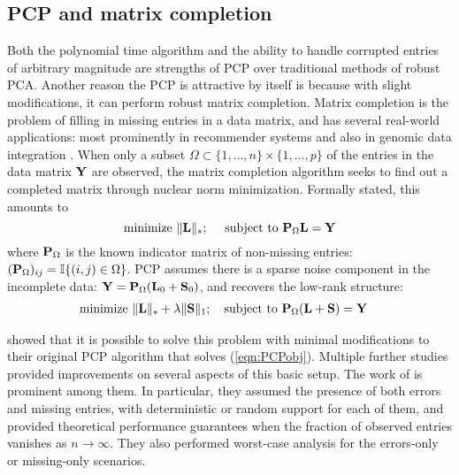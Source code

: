 \subsection*{\sffamily \large PCP and matrix completion}
Both the polynomial time algorithm and the ability to handle corrupted entries of arbitrary magnitude are strengths of PCP over traditional methods of robust PCA. Another reason the PCP is attractive by itself is because with slight modifications, it can perform robust matrix completion. Matrix completion is the problem of filling in missing entries in a data matrix, and has several real-world applications: most prominently in recommender systems \citep{CandesTao10} and also in genomic data integration \citep{CaiEtal16}. When only a subset $\Omega \subset \{ 1, \ldots, n\} \times \{ 1, \ldots, p\}$ of the entries in the data matrix ${\mathbf{Y}}$ are observed, the matrix completion algorithm seeks to find out a completed matrix through nuclear norm minimization. Formally stated, this amounts to
%
$$
\text{minimize } \| {\mathbf{L}} \|_*; \quad \text{ subject to } {\mathbf{P}}_\Omega {\mathbf{L}} = {\mathbf{Y}}
$$
%
where ${\mathbf{P}}_\Omega$ is the known indicator matrix of non-missing entries: $({\mathbf{P}}_\Omega)_{ij} = {\mathbb{I}} \{(i,j) \in \Omega \}$. PCP assumes there is a sparse noise component in the incomplete data: ${\mathbf{Y}} = {\mathbf{P}}_\Omega ({\mathbf{L}}_0 + {\mathbf{S}}_0)$, and recovers the low-rank structure:
%
\begin{align}\label{eqn:PCPMCobj}
& \text{minimize } \| {\mathbf{L}} \|_* + \lambda \| {\mathbf{S}} \|_1; \quad \text{subject to } {\mathbf{P}}_\Omega({\mathbf{L}} + {\mathbf{S}}) = {\mathbf{Y}}
\end{align}
%

\cite{CandesEtal09} showed that it is possible to solve this problem with minimal modifications to their original PCP algorithm that solves (\ref{eqn:PCPobj}). Multiple further studies provided improvements on several aspects of this basic setup. The work of \cite{ChenEtal11} is prominent among them. In particular, they assumed the presence of both errors and missing entries, with deterministic or random support for each of them, and provided theoretical performance guarantees when the fraction of observed entries vanishes as $n \rightarrow \infty$. They also performed worst-case analysis for the errors-only or missing-only scenarios.

